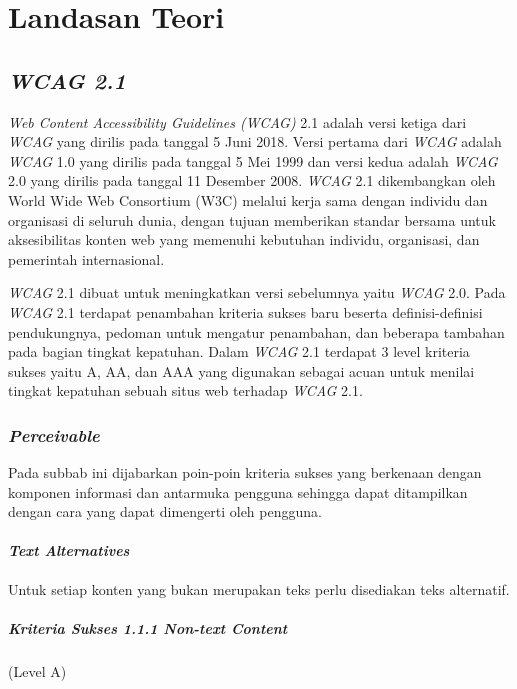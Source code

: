\setcounter{secnumdepth}{3}

\chapter{Landasan Teori}
\label{chap:teori}

\section{\textit{WCAG 2.1}}
\label{sec:wcag_2.1} 
\textit{Web Content Accessibility Guidelines (WCAG)} 2.1 adalah versi ketiga dari \textit{WCAG} yang dirilis pada tanggal 5 Juni 2018. Versi pertama dari \textit{WCAG} adalah \textit{WCAG} 1.0 yang dirilis pada tanggal 5 Mei 1999 dan versi kedua adalah \textit{WCAG} 2.0 yang dirilis pada tanggal 11 Desember 2008. \textit{WCAG} 2.1 dikembangkan oleh World Wide Web Consortium (W3C) melalui kerja sama dengan individu dan organisasi di seluruh dunia, dengan tujuan memberikan standar bersama untuk aksesibilitas konten web yang memenuhi kebutuhan individu, organisasi, dan pemerintah internasional. 

\textit{WCAG} 2.1 dibuat untuk meningkatkan versi sebelumnya yaitu \textit{WCAG} 2.0. Pada \textit{WCAG} 2.1 terdapat penambahan kriteria sukses baru beserta definisi-definisi pendukungnya, pedoman untuk mengatur penambahan, dan beberapa tambahan pada bagian tingkat kepatuhan. Dalam \textit{WCAG} 2.1 terdapat 3 level kriteria sukses yaitu A, AA, dan AAA yang digunakan sebagai acuan untuk menilai tingkat kepatuhan sebuah situs web terhadap \textit{WCAG} 2.1.

\subsection{\textit{Perceivable}}
\label{sec:perceivable}
Pada subbab ini dijabarkan poin-poin kriteria sukses yang berkenaan dengan komponen informasi dan antarmuka pengguna sehingga dapat ditampilkan dengan cara yang dapat dimengerti oleh pengguna.

\subsubsection{\textit{Text Alternatives}}
\label{sec:text_alternatives}
Untuk setiap konten yang bukan merupakan teks perlu disediakan teks alternatif.

\paragraph{Kriteria Sukses 1.1.1 \textit{Non-text Content}}
\label{sec:kriteria_sukses_1.1.1}
(Level A)\\

